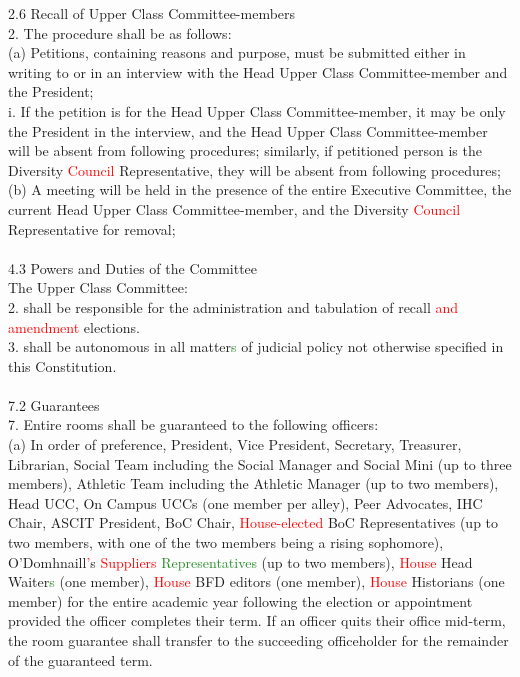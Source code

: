 \documentclass[10pt]{article} %
\newcommand{\add}[1]{\textcolor{ForestGreen}{#1}} %
\newcommand{\del}[1]{\textcolor{red}{#1}} %
\newcommand{\swap}[2]{\del{#1} \add{#2}} %
\begin{document}
\begin{itemize}
        2.6 Recall of Upper Class Committee-members \\
        2. The procedure shall be as follows: \\
        (a) Petitions, containing reasons and purpose, must be submitted either in writing to or in an interview with the Head Upper Class Committee-member and the President; \\
        i. If the petition is for the Head Upper Class Committee-member, it may be only the President in the interview, and the Head Upper Class Committee-member will be absent from following procedures; similarly, if petitioned person is the Diversity \del{Council} Representative, they will be absent from following procedures; \\
        (b) A meeting will be held in the presence of the entire Executive Committee, the current Head Upper Class Committee-member, and the Diversity \del{Council} Representative for removal; \\ \\
        4.3 Powers and Duties of the Committee \\
        The Upper Class Committee: \\
        2. shall be responsible for the administration and tabulation of recall \del{and amendment} elections. \\
        3. shall be autonomous in all matter\add{s} of judicial policy not otherwise specified in this Constitution. \\ \\
        7.2 Guarantees \\
        7. Entire rooms shall be guaranteed to the following officers: \\
        (a) In order of preference, President, Vice President, Secretary, Treasurer, Librarian, Social Team including the Social Manager and Social Mini (up to three members), Athletic Team including the Athletic Manager (up to two members), Head UCC, On Campus UCCs (one member per alley), Peer Advocates, IHC Chair, ASCIT President, BoC Chair, \del{House-elected} BoC Representatives (up to two members, with one of the two members being a rising sophomore), O'Domhnaill\del{'}s \swap{Suppliers}{Representatives} (up to two members), \del{House} Head Waiter\add{s} (one member), \del{House} BFD editors (one member), \del{House} Historians (one member) for the entire academic year following the election or appointment provided the officer completes their term. If an officer quits their office mid-term, the room guarantee shall transfer to the succeeding officeholder for the remainder of the guaranteed term. \\

\end{itemize}
\end{document}
